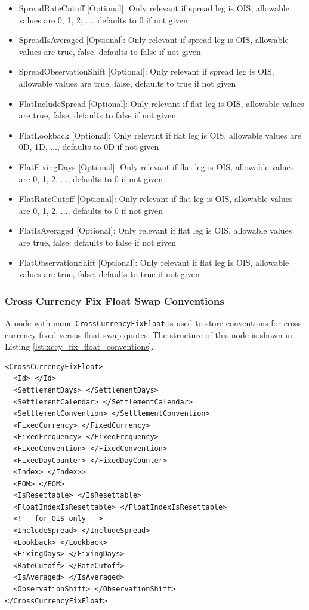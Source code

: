 \begin{itemize}
\item SpreadRateCutoff [Optional]: Only relevant if spread leg is OIS, allowable values are 0, 1, 2, ..., defaults to 0 if not given
\item SpreadIsAveraged [Optional]: Only relevant if spread leg is OIS, allowable values are true, false, defaults to false if not given
\item SpreadObservationShift [Optional]: Only relevant if spread leg is OIS, allowable values are true, false, defaults to true if not given
\item FlatIncludeSpread [Optional]: Only relevant if flat leg is OIS, allowable values are true, false, defaults to false if not given
\item FlatLookback [Optional]: Only relevant if flat leg is OIS, allowable values are 0D, 1D, ..., defaults to 0D if not given
\item FlatFixingDays [Optional]: Only relevant if flat leg is OIS, allowable values are 0, 1, 2, ..., defaults to 0 if not given
\item FlatRateCutoff [Optional]: Only relevant if flat leg is OIS, allowable values are 0, 1, 2, ..., defaults to 0 if not given
\item FlatIsAveraged [Optional]: Only relevant if flat leg is OIS, allowable values are true, false, defaults to false if not given
\item FlatObservationShift [Optional]: Only relevant if flat leg is OIS, allowable values are true, false, defaults to true if not given
\end{itemize}

\subsubsection{Cross Currency Fix Float Swap Conventions}
A node with name \lstinline!CrossCurrencyFixFloat! is used to store conventions for cross currency fixed versus float swap quotes.
The structure of this node is shown in Listing \ref{lst:xccy_fix_float_conventions}.

\begin{listing}[H]
\begin{verbatim}
<CrossCurrencyFixFloat>
  <Id> </Id>
  <SettlementDays> </SettlementDays>
  <SettlementCalendar> </SettlementCalendar>
  <SettlementConvention> </SettlementConvention>
  <FixedCurrency> </FixedCurrency>
  <FixedFrequency> </FixedFrequency>
  <FixedConvention> </FixedConvention>
  <FixedDayCounter> </FixedDayCounter>
  <Index> </Index>>
  <EOM> </EOM>
  <IsResettable> </IsResettable>
  <FloatIndexIsResettable> </FloatIndexIsResettable>
  <!-- for OIS only -->
  <IncludeSpread> </IncludeSpread>
  <Lookback> </Lookback>
  <FixingDays> </FixingDays>
  <RateCutoff> </RateCutoff>
  <IsAveraged> </IsAveraged>
  <ObservationShift> </ObservationShift>
</CrossCurrencyFixFloat>
\end{verbatim}
\caption{Cross currency fix float swap conventions}
\label{lst:xccy_fix_float_conventions}
\end{listing}

